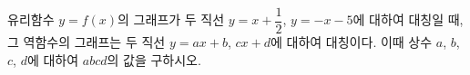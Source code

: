 \hspace*{2mm}\begin{minipage}[t]{\dimexpr\linewidth-2mm\relax}\vspace{0pt}
유리함수 $y=f(x)$의 그래프가 두 직선 $y=x+\dfrac{1}{2}$, $y=-x-5$에 대하여 대칭일 때, 그 역함수의 그래프는 두 직선 $y=ax+b$, $cx+d$에 대하여 대칭이다. 이때 상수 $a$, $b$, $c$, $d$에 대하여 $abcd$의 값을 구하시오.\end{minipage}
